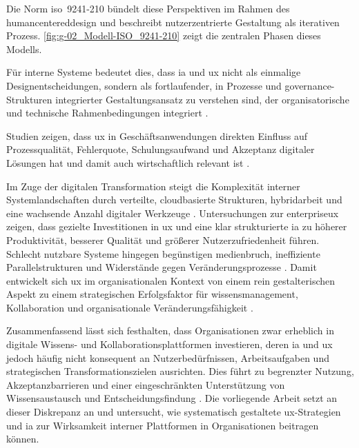 \newpage

Die Norm \acrshort{iso}~9241-210 bündelt diese Perspektiven im Rahmen des \Gls{humancentereddesign} und beschreibt nutzerzentrierte Gestaltung als iterativen Prozess. \autoref{fig:g-02_Modell-ISO_9241-210} zeigt die zentralen Phasen dieses Modells.


Für interne Systeme bedeutet dies, dass \Gls{ia} und \Gls{ux} nicht als einmalige Designentscheidungen, sondern als fortlaufender, in Prozesse und \Gls{governance}-Strukturen integrierter Gestaltungsansatz zu verstehen sind, der organisatorische und technische Rahmenbedingungen integriert \cite{500:ISO9241-210,300:FraunhoferIESE2018}.

Studien zeigen, dass \Gls{ux} in Geschäftsanwendungen direkten Einfluss auf Prozessqualität, Fehlerquote, Schulungsaufwand und Akzeptanz digitaler Lösungen hat und damit auch wirtschaftlich relevant ist \cite{300:FraunhoferIESE2018,301:Infragistics2015,100:WhartonUX2015}.

Im Zuge der digitalen Transformation steigt die Komplexität interner Systemlandschaften durch verteilte, cloudbasierte Strukturen, \gls{hybridarbeit} und eine wachsende Anzahl digitaler Werkzeuge \cite{302:GSMA2024}. Untersuchungen zur \Gls{enterpriseux} zeigen, dass gezielte Investitionen in \Gls{ux} und eine klar strukturierte \Gls{ia} zu höherer Produktivität, besserer Qualität und größerer Nutzerzufriedenheit führen. Schlecht nutzbare Systeme hingegen begünstigen \Gls{medienbruch}, ineffiziente Parallelstrukturen und Widerstände gegen Veränderungsprozesse \cite{101:Khan2021,300:FraunhoferIESE2018,301:Infragistics2015}. Damit entwickelt sich \Gls{ux} im organisationalen Kontext von einem rein gestalterischen Aspekt zu einem strategischen Erfolgsfaktor für \Gls{wissensmanagement}, Kollaboration und organisationale Veränderungsfähigkeit \cite{100:WhartonUX2015,300:FraunhoferIESE2018}.

Zusammenfassend lässt sich festhalten, dass Organisationen zwar erheblich in digitale Wissens- und Kollaborationsplattformen investieren, deren \Gls{ia} und \Gls{ux} jedoch häufig nicht konsequent an Nutzerbedürfnissen, Arbeitsaufgaben und strategischen Transformationszielen ausrichten. Dies führt zu begrenzter Nutzung, Akzeptanzbarrieren und einer eingeschränkten Unterstützung von Wissensaustausch und Entscheidungsfindung \cite{301:Infragistics2015,303:Rosenfeld2015}. Die vorliegende Arbeit setzt an dieser Diskrepanz an und untersucht, wie systematisch gestaltete \Gls{ux}-Strategien und \Gls{ia} zur Wirksamkeit interner Plattformen in Organisationen beitragen können.
